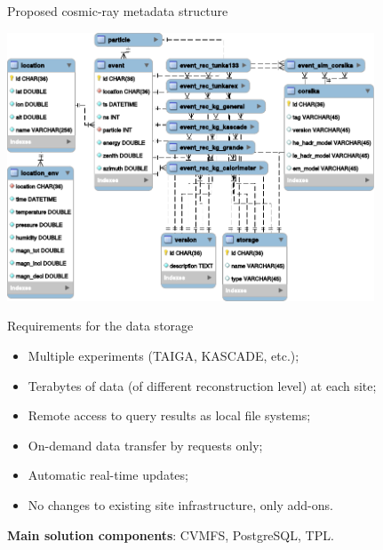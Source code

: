
\begin{frame}{Proposed cosmic-ray metadata structure}
    \vspace{-1.5em}
    \begin{center}
        \includegraphics[width=0.82\textwidth]{pics/metadata.pdf}
    \end{center}
\end{frame}

\begin{frame}{Requirements for the data storage}
  \begin{itemize}
    \item Multiple experiments (TAIGA, KASCADE, etc.);
    \item Terabytes of data (of different reconstruction level) at each site;
    \item Remote access to query results as local file systems;
    \item  On-demand data transfer by requests only;
    \item  Automatic real-time updates;
    \item  No changes to existing site infrastructure, only add-ons.
  \end{itemize}
  \vspace{1em}
  \textbf{Main solution components}: CVMFS, PostgreSQL, TPL.
\end{frame}
